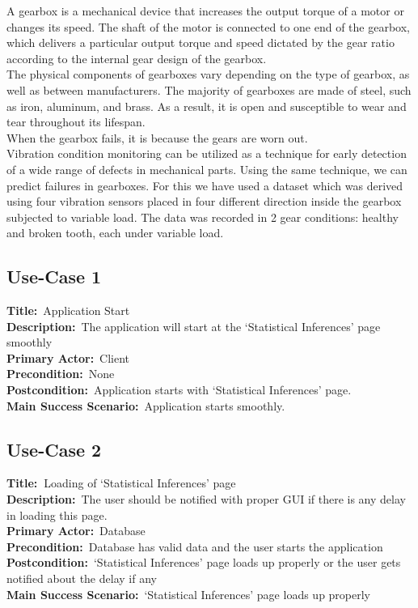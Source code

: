 \label{sec:use-case}

A gearbox is a mechanical device that increases the output torque of a motor or changes its speed. The shaft of the motor is connected to one end of the gearbox, which delivers a particular output torque and speed dictated by the gear ratio according to the internal gear design of the gearbox. \\
The physical components of gearboxes vary depending on the type of gearbox, as well as between manufacturers. The majority of gearboxes are made of steel, such as iron, aluminum, and brass. As a result, it is open and susceptible to wear and tear throughout its lifespan.\\

When the gearbox fails, it is because the gears are worn out.\\

Vibration condition monitoring can be utilized as a technique for early detection of a wide range of defects in mechanical parts. Using the same technique, we can predict failures in gearboxes. For this we have used a dataset which was derived using four vibration sensors placed in four different direction inside the gearbox subjected to variable load. The data was recorded in 2 gear conditions: healthy and broken tooth, each under variable load.\\

\subsection{Use-Case 1}

\textbf{Title:} Application Start\\
\textbf{Description:} The application will start at the ‘Statistical Inferences’ page smoothly\\
\textbf{Primary Actor:} Client\\
\textbf{Precondition:} None\\
\textbf{Postcondition:} Application starts with ‘Statistical Inferences’ page.\\
\textbf{Main Success Scenario:} Application starts smoothly.\\

\subsection{Use-Case 2}
\textbf{Title: }Loading of ‘Statistical Inferences’ page\\
\textbf{Description:} The user should be notified with proper GUI if there is any delay in loading this page.\\
\textbf{Primary Actor:} Database\\
\textbf{Precondition:} Database has valid data and the user starts the application\\
\textbf{Postcondition:} ‘Statistical Inferences’ page loads up properly or the user gets notified about the delay if any\\
\textbf{Main Success Scenario:} ‘Statistical Inferences’ page loads up properly\\
